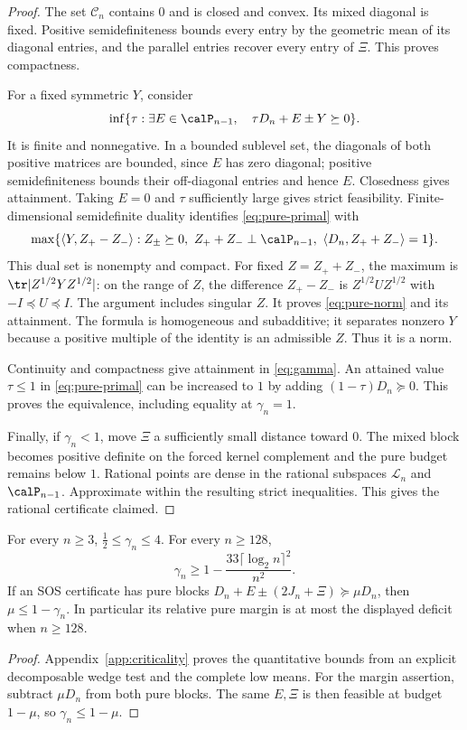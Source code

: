 \begin{proof}
The set $\mathcal C_n$ contains $0$ and is closed and convex.
Its mixed diagonal is fixed. Positive semidefiniteness bounds every
entry by the geometric mean of its diagonal entries, and the parallel
entries recover every entry of $\Xi$. This proves compactness.

For a fixed symmetric $Y$, consider
\begin{equation}\label{eq:pure-primal}
 \inf\{\tau:\exists E\in\calP_{n-1},\quad \tau D_n+E\pm Y\succeq0\}.
\end{equation}
It is finite and nonnegative. In a bounded sublevel set, the diagonals
of both positive matrices are bounded, since $E$ has zero diagonal;
positive semidefiniteness bounds their off-diagonal entries and hence
$E$. Closedness gives attainment. Taking $E=0$ and $\tau$ sufficiently
large gives strict feasibility. Finite-dimensional semidefinite duality
identifies \eqref{eq:pure-primal} with
\[
 \max\{\langle Y,Z_+-Z_-\rangle:
 Z_\pm\succeq0,\ Z_++Z_-\perp\calP_{n-1},\
 \langle D_n,Z_++Z_-\rangle=1\}.
\]
This dual set is nonempty and compact. For fixed $Z=Z_++Z_-$, the
maximum is $\tr|Z^{1/2}YZ^{1/2}|$: on the range of $Z$, the difference
$Z_+-Z_-$ is $Z^{1/2}UZ^{1/2}$ with $-I\preceq U\preceq I$.
The argument includes singular $Z$. It proves \eqref{eq:pure-norm} and its
attainment. The formula is homogeneous and subadditive; it separates
nonzero $Y$ because a positive multiple of the identity is an admissible
$Z$. Thus it is a norm.

Continuity and compactness give attainment in \eqref{eq:gamma}.
An attained value $\tau\le1$ in \eqref{eq:pure-primal} can be increased
to $1$ by adding $(1-\tau)D_n\succeq0$. This proves the equivalence,
including equality at $\gamma_n=1$.

Finally, if $\gamma_n<1$, move $\Xi$ a sufficiently small distance
toward $0$. The mixed block becomes positive definite on the forced
kernel complement and the pure budget remains below $1$. Rational
points are dense in the rational subspaces $\mathcal L_n$ and
$\calP_{n-1}$. Approximate within the resulting strict inequalities.
This gives the rational certificate claimed.
\end{proof}

\begin{theorem}\label{thm:criticality}
For every $n\ge3$, $\tfrac12\le\gamma_n\le4$. For every $n\ge128$,
\begin{equation}\label{eq:criticality}
                  \gamma_n\ge1-\frac{33\lceil\log_2n\rceil^2}{n^2}.
\end{equation}
If an SOS certificate has pure blocks
$D_n+E\pm(2J_n+\Xi)\succeq\mu D_n$, then
$\mu\le1-\gamma_n$. In particular its relative pure margin is at most
the displayed deficit when $n\ge128$.
\end{theorem}
\begin{proof}
Appendix~\ref{app:criticality} proves the quantitative bounds from an
explicit decomposable wedge test and the complete low means.
For the margin assertion, subtract $\mu D_n$ from both pure blocks.
The same $E,\Xi$ is then feasible at budget $1-\mu$, so
$\gamma_n\le1-\mu$.
\end{proof}


